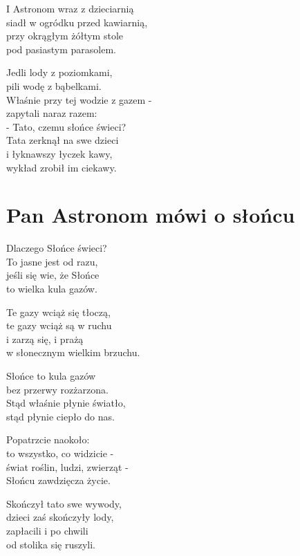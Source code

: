 \documentclass[11pt,a4pape,leqno,twoside]{book}
\begin{document}
I Astronom wraz z dzieciarnią\\
siadł w ogródku przed kawiarnią,\\
przy okrągłym żółtym stole\\
pod pasiastym parasolem.\\ \vspace{0.1cm}

Jedli lody z poziomkami,\\
pili wodę z bąbelkami.\\
Właśnie przy tej wodzie z gazem -\\
zapytali naraz razem:\\
- Tato, czemu słońce świeci?\\
Tata zerknął na swe dzieci\\
i łyknawszy łyczek kawy,\\
wykład zrobił im ciekawy.

\chapter{Pan Astronom mówi o słońcu}
Dlaczego Słońce świeci?\\
To jasne jest od razu,\\
jeśli się wie, że Słońce\\
to wielka kula gazów.\\ \vspace{0.1cm}

Te gazy wciąż się tłoczą,\\
te gazy wciąż są w ruchu\\
i zarzą się, i prażą\\
w słonecznym wielkim brzuchu.\\ \vspace{0.1cm}

Słońce to kula gazów\\
bez przerwy rozżarzona.\\
Stąd właśnie płynie światło,\\
stąd płynie ciepło do nas.\\ \vspace{0.1cm}

Popatrzcie naokoło:\\
to wszystko, co widzicie -\\
świat roślin, ludzi, zwierząt -\\
Słońcu zawdzięcza życie.\\ \vspace{0.1cm}

Skończył tato swe wywody,\\
dzieci zaś skończyły lody,\\
zapłacili i po chwili\\
od stolika się ruszyli.\\ \vspace{0.1cm}
\end{document}

